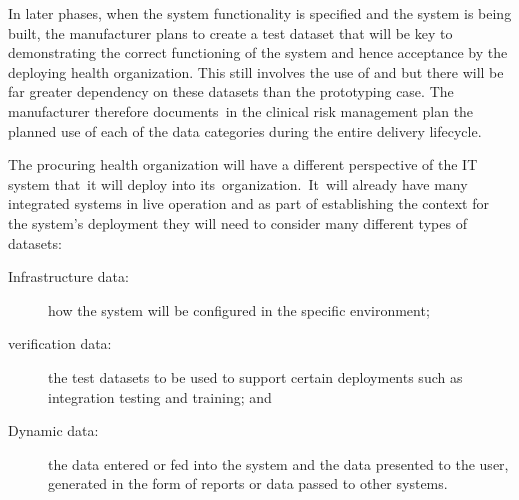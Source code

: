 In later phases, when the system functionality is specified and the system is being built, the manufacturer plans to create a test \gls{dataset} that will be key to demonstrating the correct functioning of the system and hence acceptance by the deploying health organization. This still involves the use of  and  but there will be far greater dependency on these \glspl{dataset} than the prototyping case. The manufacturer therefore documents\cbstart\ in the clinical risk management plan the planned use of each of the data categories during the entire delivery lifecycle\cbend.

\begin{minipage}[t]{0.73\textwidth}
	The procuring health organization will have a different perspective of the IT system that\cbstart\ it will deploy into its\cbend\ organization.\cbstart\ It\cbend\ will already have many integrated systems in live operation and as part of establishing the context for the system's deployment they will need to consider many different types of \glspl{dataset}:
\end{minipage}
\begin{minipage}[t]{0.25\textwidth}
  \centering{}
\end{minipage}
	\begin{description}
		\item[Infrastructure data:] how the system will be configured in the specific environment;
		\item[\Gls{verification} data:] the test \glspl{dataset} to be used to support certain deployments such as integration testing and training; and
		\item[Dynamic data:] the data entered or fed into the system and the data presented to the user, generated in the form of reports or data passed to other systems.
	\end{description}

